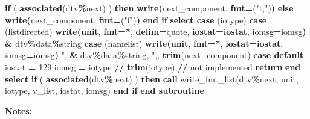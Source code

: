 \documentclass[
  paper=a4,
  ,captions=tableheading
]{scrartcl}
\newenvironment{Shaded}{\begin{snugshade}}{\end{snugshade}}
\newcommand{\DecValTok}[1]{\textcolor[rgb]{0.00,0.00,0.81}{#1}}
\newcommand{\FunctionTok}[1]{\textcolor[rgb]{0.13,0.29,0.53}{\textbf{#1}}}
\newcommand{\KeywordTok}[1]{\textcolor[rgb]{0.13,0.29,0.53}{\textbf{#1}}}
\newcommand{\NormalTok}[1]{#1}
\newcommand{\OperatorTok}[1]{\textcolor[rgb]{0.81,0.36,0.00}{\textbf{#1}}}
\newcommand{\StringTok}[1]{\textcolor[rgb]{0.31,0.60,0.02}{#1}}
\begin{document}
\begin{Shaded}
\begin{Highlighting}[]
  \KeywordTok{if}\NormalTok{ ( }\FunctionTok{associated}\NormalTok{(dtv}\OperatorTok{\%}\NormalTok{next) ) }\KeywordTok{then}
    \FunctionTok{write(}\NormalTok{next\_component, }\FunctionTok{fmt}\KeywordTok{=}\StringTok{\textquotesingle{}("t,")\textquotesingle{}}\FunctionTok{)}
  \KeywordTok{else}
    \FunctionTok{write(}\NormalTok{next\_component, }\FunctionTok{fmt}\KeywordTok{=}\StringTok{\textquotesingle{}("f")\textquotesingle{}}\FunctionTok{)}
  \KeywordTok{end if}
  \KeywordTok{select case}\NormalTok{ (iotype)}
  \KeywordTok{case}\NormalTok{ (}\StringTok{\textquotesingle{}listdirected\textquotesingle{}}\NormalTok{)}
    \FunctionTok{write(unit}\NormalTok{, }\FunctionTok{fmt}\KeywordTok{=}\FunctionTok{*}\NormalTok{, }\FunctionTok{delim}\KeywordTok{=}\StringTok{\textquotesingle{}quote\textquotesingle{}}\NormalTok{, }\FunctionTok{iostat}\KeywordTok{=}\FunctionTok{iostat}\NormalTok{, iomsg}\KeywordTok{=}\NormalTok{iomsg}\FunctionTok{)} \KeywordTok{\&}
\NormalTok{      dtv}\OperatorTok{\%}\NormalTok{data}\OperatorTok{\%}\NormalTok{string}
  \KeywordTok{case}\NormalTok{ (}\StringTok{\textquotesingle{}namelist\textquotesingle{}}\NormalTok{)}
    \FunctionTok{write(unit}\NormalTok{, }\FunctionTok{fmt}\KeywordTok{=}\FunctionTok{*}\NormalTok{, }\FunctionTok{iostat}\KeywordTok{=}\FunctionTok{iostat}\NormalTok{, iomsg}\KeywordTok{=}\NormalTok{iomsg}\FunctionTok{)} \StringTok{\textquotesingle{}"\textquotesingle{}}\NormalTok{, }\KeywordTok{\&}
\NormalTok{      dtv}\OperatorTok{\%}\NormalTok{data}\OperatorTok{\%}\NormalTok{string, }\StringTok{\textquotesingle{}",\textquotesingle{}}\NormalTok{, }\FunctionTok{trim}\NormalTok{(next\_component)}
  \KeywordTok{case default}
\NormalTok{    iostat }\KeywordTok{=} \DecValTok{129}
\NormalTok{    iomsg }\KeywordTok{=} \StringTok{\textquotesingle{}iotype \textquotesingle{}} \KeywordTok{//} \FunctionTok{trim}\NormalTok{(iotype) }\KeywordTok{//} \StringTok{\textquotesingle{} not implemented\textquotesingle{}}
    \KeywordTok{return}
  \KeywordTok{end select}
  \KeywordTok{if}\NormalTok{ ( }\FunctionTok{associated}\NormalTok{(dtv}\OperatorTok{\%}\NormalTok{next) ) }\KeywordTok{then}
    \KeywordTok{call}\NormalTok{ write\_fmt\_list(dtv}\OperatorTok{\%}\NormalTok{next, unit, iotype, v\_list, iostat, iomsg)}
  \KeywordTok{end if}
\KeywordTok{end subroutine}
\end{Highlighting}
\end{Shaded}

\textbf{Notes:}
\end{document}
